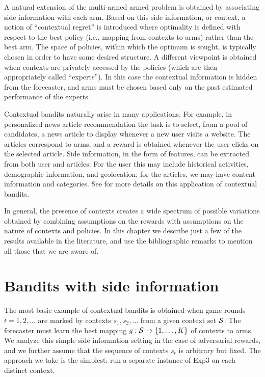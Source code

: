A natural extension of the multi-armed armed problem is obtained by associating side information with each arm. Based on this side information, or context, a notion of ``contextual regret'' is introduced where optimality is defined with respect to the best policy (i.e., mapping from contexts to arms) rather than the best arm. The space of policies, within which the optimum is sought, is typically chosen in order to have some desired structure. A different viewpoint is obtained when contexts are privately accessed by the policies (which are then appropriately called ``experts''). In this case the contextual information is hidden from the forecaster, and arms must be chosen based only on the past estimated performance of the experts.

Contextual bandits naturally arise in many applications. For example, in personalized news article recommendation the task is to select, from a pool of candidates, a news article to display whenever a new user visits a website. The articles correspond to arms, and a reward is obtained whenever the user clicks on the selected article. Side information, in the form of features, can be extracted from both user and articles. For the user this may include historical activities, demographic information, and geolocation; for the articles, we may have content information and categories. See \cite{li2010contextual} for more details on this application of contextual bandits.


In general, the presence of contexts creates a wide spectrum of possible variations obtained by combining assumptions on the rewards with assumptions on the nature of contexts and policies. In this chapter we describe just a few of the results available in the literature, and use the bibliographic remarks to mention all those that we are aware of.

\section{Bandits with side information}
\label{s:context-intro}
%
The most basic example of contextual bandits is obtained when game rounds $t=1,2,\dots$ are marked by contexts $s_1,s_2,\dots$ from a given context set $\mathcal{S}$. The forecaster must learn the best mapping $g : \mathcal{S} \to \{1,\dots,K\}$ of contexts to arms. We analyze this simple side information setting in the case of adversarial rewards, and we further assume that the sequence of contexts $s_t$ is arbitrary but fixed. The approach we take is the simplest: run a separate instance of Exp3 on each distinct context.

